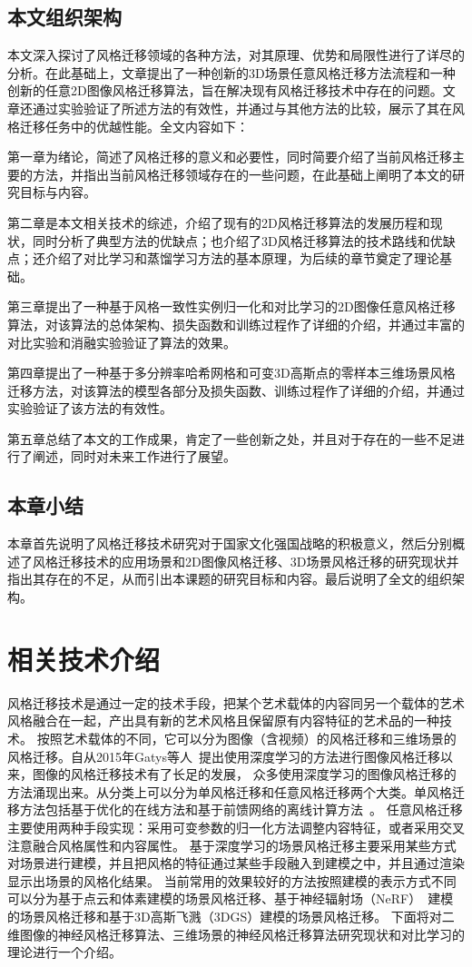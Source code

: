 \section{本文组织架构}
本文深入探讨了风格迁移领域的各种方法，对其原理、优势和局限性进行了详尽的分析。在此基础上，文章提出了一种创新的3D场景任意风格迁移方法流程和一种创新的任意2D图像风格迁移算法，旨在解决现有风格迁移技术中存在的问题。文章还通过实验验证了所述方法的有效性，并通过与其他方法的比较，展示了其在风格迁移任务中的优越性能。全文内容如下：
\par 第一章为绪论，简述了风格迁移的意义和必要性，同时简要介绍了当前风格迁移主要的方法，并指出当前风格迁移领域存在的一些问题，在此基础上阐明了本文的研究目标与内容。 
\par 第二章是本文相关技术的综述，介绍了现有的2D风格迁移算法的发展历程和现状，同时分析了典型方法的优缺点；也介绍了3D风格迁移算法的技术路线和优缺点；还介绍了对比学习和蒸馏学习方法的基本原理，为后续的章节奠定了理论基础。
\par 第三章提出了一种基于风格一致性实例归一化和对比学习的2D图像任意风格迁移算法，对该算法的总体架构、损失函数和训练过程作了详细的介绍，并通过丰富的对比实验和消融实验验证了算法的效果。
\par 第四章提出了一种基于多分辨率哈希网格和可变3D高斯点的零样本三维场景风格迁移方法，对该算法的模型各部分及损失函数、训练过程作了详细的介绍，并通过实验验证了该方法的有效性。
\par 第五章总结了本文的工作成果，肯定了一些创新之处，并且对于存在的一些不足进行了阐述，同时对未来工作进行了展望。

\section{本章小结}
本章首先说明了风格迁移技术研究对于国家文化强国战略的积极意义，然后分别概述了风格迁移技术的应用场景和2D图像风格迁移、3D场景风格迁移的研究现状并指出其存在的不足，从而引出本课题的研究目标和内容。最后说明了全文的组织架构。  

\chapter{相关技术介绍}
风格迁移技术是通过一定的技术手段，把某个艺术载体的内容同另一个载体的艺术风格融合在一起，产出具有新的艺术风格且保留原有内容特征的艺术品的一种技术。
按照艺术载体的不同，它可以分为图像（含视频）的风格迁移和三维场景的风格迁移。自从2015年Gatys等人~\cite{gatys2016image}提出使用深度学习的方法进行图像风格迁移以来，图像的风格迁移技术有了长足的发展，
众多使用深度学习的图像风格迁移的方法涌现出来。从分类上可以分为单风格迁移和任意风格迁移两个大类。单风格迁移方法包括基于优化的在线方法和基于前馈网络的离线计算方法~\cite{jing2019neural}。
任意风格迁移主要使用两种手段实现：采用可变参数的归一化方法调整内容特征，或者采用交叉注意融合风格属性和内容属性。
基于深度学习的场景风格迁移主要采用某些方式对场景进行建模，并且把风格的特征通过某些手段融入到建模之中，并且通过渲染显示出场景的风格化结果。
当前常用的效果较好的方法按照建模的表示方式不同可以分为基于点云和体素建模的场景风格迁移、基于神经辐射场（NeRF）~\cite{mildenhall2021nerf}建模的场景风格迁移和基于3D高斯飞溅（3DGS）建模的场景风格迁移。
下面将对二维图像的神经风格迁移算法、三维场景的神经风格迁移算法研究现状和对比学习的理论进行一个介绍。
